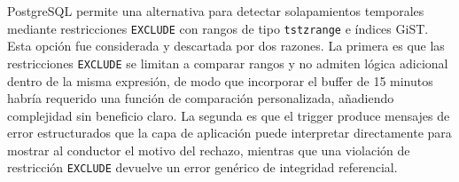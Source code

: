 PostgreSQL permite una alternativa para detectar solapamientos temporales mediante restricciones \texttt{EXCLUDE} con rangos de tipo \texttt{tstzrange} e índices GiST. Esta opción fue considerada y descartada por dos razones. La primera es que las restricciones \texttt{EXCLUDE} se limitan a comparar rangos y no admiten lógica adicional dentro de la misma expresión, de modo que incorporar el buffer de 15 minutos habría requerido una función de comparación personalizada, añadiendo complejidad sin beneficio claro. La segunda es que el trigger produce mensajes de error estructurados que la capa de aplicación puede interpretar directamente para mostrar al conductor el motivo del rechazo, mientras que una violación de restricción \texttt{EXCLUDE} devuelve un error genérico de integridad referencial.
